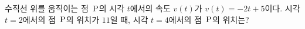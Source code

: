 수직선 위를 움직이는 점~$\mathrm{P}$의 시각 $t$에서의 속도 $v(t)$가 $v(t)=-2t+5$이다. 시각 $t=2$에서의 점~$\mathrm{P}$의 위치가 $11$일 때, 시각 $t=4$에서의 점~$\mathrm{P}$의 위치는?

